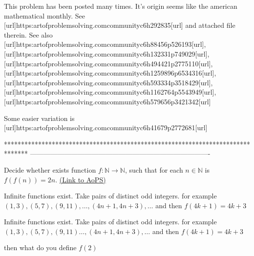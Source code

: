 \begin{solution}
	This problem has been posted many times.
It's origin seems like the american mathematical monthly. See [url]https:\/\/artofproblemsolving.com\/community\/c6h292835[\/url] and attached file therein.
See also [url]https:\/\/artofproblemsolving.com\/community\/c6h88456p526193[\/url], [url]https:\/\/artofproblemsolving.com\/community\/c6h132331p749029[\/url], 
[url]https:\/\/artofproblemsolving.com\/community\/c6h494421p2775110[\/url],
[url]https:\/\/artofproblemsolving.com\/community\/c6h1259896p6534316[\/url],
[url]https:\/\/artofproblemsolving.com\/community\/c6h593334p3518429[\/url],
[url]https:\/\/artofproblemsolving.com\/community\/c6h1162764p5543949[\/url],
[url]https:\/\/artofproblemsolving.com\/community\/c6h579656p3421342[\/url]

Some easier variation is
[url]https:\/\/artofproblemsolving.com\/community\/c6h41679p2772681[\/url]


\end{solution}
*******************************************************************************
-------------------------------------------------------------------------------

\begin{problem}
	Decide whether exists function $f:  \mathbb{N} \rightarrow  \mathbb{N}$, such that for each $n \in  \mathbb{N}$ is $f(f(n) )= 2n$.
	\flushright \href{https://artofproblemsolving.com/community/c6h1632408}{(Link to AoPS)}
\end{problem}



\begin{solution}
	Infinite functions exist.
Take pairs of distinct odd integers. for example $(1,3),(5,7),(9,11),\dots,(4n+1,4n+3),\dots$
and then $f(4k+1)=4k+3$
\end{solution}



\begin{solution}
	\begin{tcolorbox}Infinite functions exist.
Take pairs of distinct odd integers. for example $(1,3),(5,7),(9,11)\dots,(4n+1,4n+3),\dots$
and then $f(4k+1)=4k+3$\end{tcolorbox}

then what do you define $f(2)$
\end{solution}




